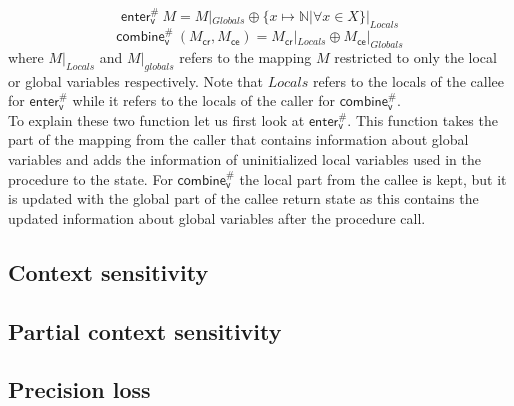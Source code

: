     \[\textsf{enter}^{\#}_\textsf{v}\ M = M|_{Globals} \oplus \{x \mapsto \mathbb{N} | \forall x \in X\}|_{Locals} \]
    \[\textsf{combine}^{\#}_\textsf{v}\ (M_\textsf{cr}, M_\textsf{ce}) = M_\textsf{cr}|_{Locals} \oplus M_\textsf{ce}|_{Globals} \]
    where $M|_{Locals}$ and $M|_{globals}$ refers to the mapping $M$ restricted to only the local or global variables respectively. Note that $Locals$ refers to the locals of the callee for $\textsf{enter}^{\#}_\textsf{v}$ while it refers to the locals of the caller for $\textsf{combine}^{\#}_\textsf{v}$.\\
    To explain these two function let us first look at $\textsf{enter}^{\#}_\textsf{v}$. This function takes the part of the mapping from the caller that contains information about global variables and adds the information of uninitialized local variables used in the procedure to the state. For $\textsf{combine}^{\#}_\textsf{v}$ the local part from the callee is kept, but it is updated with the global part of the callee return state as this contains the updated information about global variables after the procedure call.\\

    \subsection{Context sensitivity}

    \subsection{Partial context sensitivity}

    \subsection{Precision loss}
    
  



